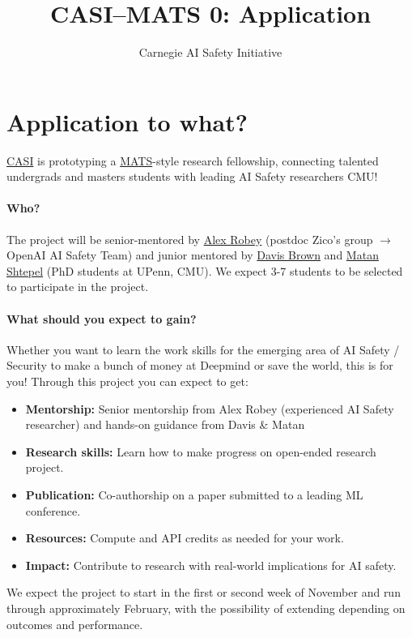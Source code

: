 \documentclass[11pt]{article}
\title{CASI--MATS 0: Application}
\author{Carnegie AI Safety Initiative}
\begin{document}
\maketitle


\section{Application to what?}

\href{https://cmuaisafety.com/}{CASI} is prototyping a \href{https://www.matsprogram.org/}{MATS}-style research fellowship, connecting talented undergrads and masters students with leading AI Safety researchers \@ CMU! 

\paragraph{Who?}
The project will be senior-mentored by \href{https://arobey1.github.io/}{Alex Robey} (postdoc \@ Zico's group $\rightarrow$ OpenAI AI Safety Team) and junior mentored by \href{https://davisrbrown.com/}{Davis Brown} and \href{https://matanshtepel.com/}{Matan Shtepel} (PhD students at UPenn, CMU).
We expect 3-7 students to be selected to participate in the project.

\paragraph{What should you expect to gain?}
Whether you want to learn the work skills for the emerging area of AI Safety / Security to make a bunch of money at Deepmind or save the world, this is for you! Through this project you can expect to get:   

\begin{itemize}[noitemsep]
    \item \textbf{Mentorship:} Senior mentorship from Alex Robey (experienced AI Safety researcher) and hands-on guidance from Davis \& Matan
    \item \textbf{Research skills:} Learn how to make progress on open-ended research project.
    \item \textbf{Publication:} Co-authorship on a paper submitted to a leading ML conference.
    \item \textbf{Resources:} Compute and API credits as needed for your work.
    \item \textbf{Impact:} Contribute to research with real-world implications for AI safety.
\end{itemize}
We expect the project to start in the first or second week of November and run through approximately February, with the possibility of extending depending on outcomes and performance. 
\end{document}
